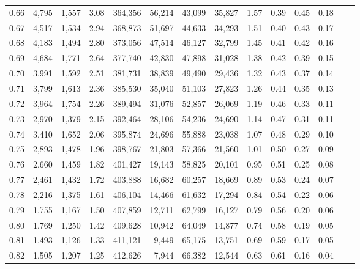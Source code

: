 \begin{tabular}{rrrrrrrrrrrrrr}
0.66 &  4,795 &  1,557 &     3.08 &  364,356 &   56,214 &  43,099 &  35,827 &  1.57 &  0.39 &  0.45 &      0.18 \\
0.67 &  4,517 &  1,534 &     2.94 &  368,873 &   51,697 &  44,633 &  34,293 &  1.51 &  0.40 &  0.43 &      0.17 \\
0.68 &  4,183 &  1,494 &     2.80 &  373,056 &   47,514 &  46,127 &  32,799 &  1.45 &  0.41 &  0.42 &      0.16 \\
0.69 &  4,684 &  1,771 &     2.64 &  377,740 &   42,830 &  47,898 &  31,028 &  1.38 &  0.42 &  0.39 &      0.15 \\
0.70 &  3,991 &  1,592 &     2.51 &  381,731 &   38,839 &  49,490 &  29,436 &  1.32 &  0.43 &  0.37 &      0.14 \\
0.71 &  3,799 &  1,613 &     2.36 &  385,530 &   35,040 &  51,103 &  27,823 &  1.26 &  0.44 &  0.35 &      0.13 \\
0.72 &  3,964 &  1,754 &     2.26 &  389,494 &   31,076 &  52,857 &  26,069 &  1.19 &  0.46 &  0.33 &      0.11 \\
0.73 &  2,970 &  1,379 &     2.15 &  392,464 &   28,106 &  54,236 &  24,690 &  1.14 &  0.47 &  0.31 &      0.11 \\
0.74 &  3,410 &  1,652 &     2.06 &  395,874 &   24,696 &  55,888 &  23,038 &  1.07 &  0.48 &  0.29 &      0.10 \\
0.75 &  2,893 &  1,478 &     1.96 &  398,767 &   21,803 &  57,366 &  21,560 &  1.01 &  0.50 &  0.27 &      0.09 \\
0.76 &  2,660 &  1,459 &     1.82 &  401,427 &   19,143 &  58,825 &  20,101 &  0.95 &  0.51 &  0.25 &      0.08 \\
0.77 &  2,461 &  1,432 &     1.72 &  403,888 &   16,682 &  60,257 &  18,669 &  0.89 &  0.53 &  0.24 &      0.07 \\
0.78 &  2,216 &  1,375 &     1.61 &  406,104 &   14,466 &  61,632 &  17,294 &  0.84 &  0.54 &  0.22 &      0.06 \\
0.79 &  1,755 &  1,167 &     1.50 &  407,859 &   12,711 &  62,799 &  16,127 &  0.79 &  0.56 &  0.20 &      0.06 \\
0.80 &  1,769 &  1,250 &     1.42 &  409,628 &   10,942 &  64,049 &  14,877 &  0.74 &  0.58 &  0.19 &      0.05 \\
0.81 &  1,493 &  1,126 &     1.33 &  411,121 &    9,449 &  65,175 &  13,751 &  0.69 &  0.59 &  0.17 &      0.05 \\
0.82 &  1,505 &  1,207 &     1.25 &  412,626 &    7,944 &  66,382 &  12,544 &  0.63 &  0.61 &  0.16 &      0.04 \\

\end{tabular}
